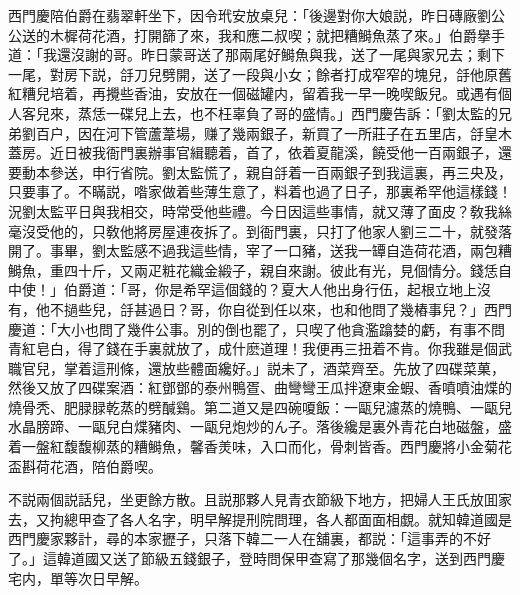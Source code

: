 西門慶陪伯爵在翡翠軒坐下，因令玳安放桌兒：「後邊對你大娘説，昨日磚廠劉公公送的木樨荷花酒，打開篩了來，我和應二叔喫；就把糟鰣魚蒸了來。」伯爵擧手道：「我還沒謝的哥。昨日蒙哥送了那兩尾好鰣魚與我，送了一尾與家兄去；剩下一尾，對房下説，㧱刀兒劈開，送了一段與小女；餘者打成窄窄的塊兒，㧱他原舊紅糟兒培着，再攪些香油，安放在一個磁罐内，留着我一早一晚喫飯兒。或遇有個人客兒來，蒸恁一碟兒上去，也不枉辜負了哥的盛情。」西門慶告訴：「劉太監的兄弟劉百户，因在河下管蘆葦場，赚了幾兩銀子，新買了一所莊子在五里店，㧱皇木蓋房。近日被我衙門裏辦事官緝聽着，首了，依着夏龍溪，饒受他一百兩銀子，還要動本參送，申行省院。劉太監慌了，親自㧱着一百兩銀子到我這裏，再三央及，只要事了。不瞞説，喒家做着些薄生意了，料着也過了日子，那裏希罕他這樣錢！況劉太監平日與我相交，時常受他些禮。今日因這些事情，就又薄了面皮？敎我絲毫沒受他的，只敎他將房屋連夜拆了。到衙門裏，只打了他家人劉三二十，就發落開了。事畢，劉太監感不過我這些情，宰了一口豬，送我一罈自造荷花酒，兩包糟鰣魚，重四十斤，又兩疋粧花織金緞子，親自來謝。彼此有光，見個情分。錢恁自中使！」伯爵道：「哥，你是希罕這個錢的？夏大人他出身行伍，起根立地上沒有，他不撾些兒，㧱甚過日？哥，你自從到任以來，也和他問了幾樁事兒？」西門慶道：「大小也問了幾件公事。別的倒也罷了，只喫了他貪濫蹹婪的虧，有事不問青紅皂白，得了錢在手裏就放了，成什麽道理！我便再三扭着不肯。你我雖是個武職官兒，掌着這刑條，還放些體面纔好。」説未了，酒菜齊至。先放了四碟菜菓，然後又放了四碟案酒：紅鄧鄧的泰州鴨疍、曲彎彎王瓜拌遼東金蝦、香噴噴油煠的燒骨秃、肥䐂䐂乾蒸的劈醎鷄。第二道又是四碗嗄飯：一甌兒濾蒸的燒鴨、一甌兒水晶膀蹄、一甌兒白煠豬肉、一甌兒炮炒的ん子。落後纔是裏外青花白地磁盤，盛着一盤紅馥馥柳蒸的糟鰣魚，馨香羙味，入口而化，骨刺皆香。西門慶將小金菊花盃斟荷花酒，陪伯爵喫。

不説兩個説話兒，坐更餘方散。且説那夥人見青衣節級下地方，把婦人王氏放囬家去，又拘總甲查了各人名字，明早解提刑院問理，各人都面面相覷。就知韓道國是西門慶家夥計，尋的本家攊子，只落下韓二一人在舖裏，都説：「這事弄的不好了。」這韓道國又送了節級五錢銀子，登時問保甲查寫了那幾個名字，送到西門慶宅内，單等次日早解。

